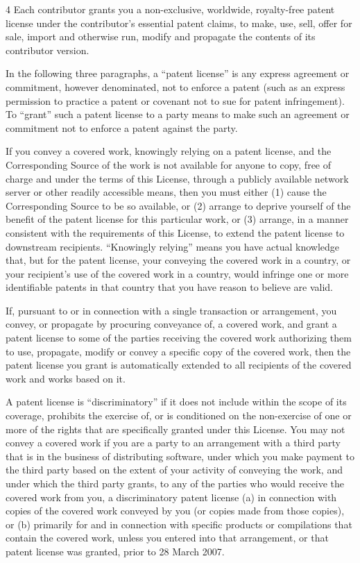 \documentclass[fontsize=11pt,paper=A4,BCOR=12mm,DIV=13,open=any,listof=totoc,toc=flat]{scrbook}
\begin{document}
{\begin{multicols}{4}
Each contributor grants you a non-exclusive, worldwide, royalty-free patent license under the contributor's essential patent claims, to make, use, sell, offer for sale, import and otherwise run, modify and propagate the contents of its contributor version.

In the following three paragraphs, a “patent license” is any express agreement or commitment, however denominated, not to enforce a patent (such as an express permission to practice a patent or covenant not to sue for patent infringement). To “grant” such a patent license to a party means to make such an agreement or commitment not to enforce a patent against the party.

If you convey a covered work, knowingly relying on a patent license, and the Corresponding Source of the work is not available for anyone to copy, free of charge and under the terms of this License, through a publicly available network server or other readily accessible means, then you must either (1) cause the Corresponding Source to be so available, or (2) arrange to deprive yourself of the benefit of the patent license for this particular work, or (3) arrange, in a manner consistent with the requirements of this License, to extend the patent license to downstream recipients. “Knowingly relying” means you have actual knowledge that, but for the patent license, your conveying the covered work in a country, or your recipient's use of the covered work in a country, would infringe one or more identifiable patents in that country that you have reason to believe are valid.

If, pursuant to or in connection with a single transaction or arrangement, you convey, or propagate by procuring conveyance of, a covered work, and grant a patent license to some of the parties receiving the covered work authorizing them to use, propagate, modify or convey a specific copy of the covered work, then the patent license you grant is automatically extended to all recipients of the covered work and works based on it.

A patent license is “discriminatory” if it does not include within the scope of its coverage, prohibits the exercise of, or is conditioned on the non-exercise of one or more of the rights that are specifically granted under this License. You may not convey a covered work if you are a party to an arrangement with a third party that is in the business of distributing software, under which you make payment to the third party based on the extent of your activity of conveying the work, and under which the third party grants, to any of the parties who would receive the covered work from you, a discriminatory patent license (a) in connection with copies of the covered work conveyed by you (or copies made from those copies), or (b) primarily for and in connection with specific products or compilations that contain the covered work, unless you entered into that arrangement, or that patent license was granted, prior to 28 March 2007.


\end{multicols}}
\end{document}

